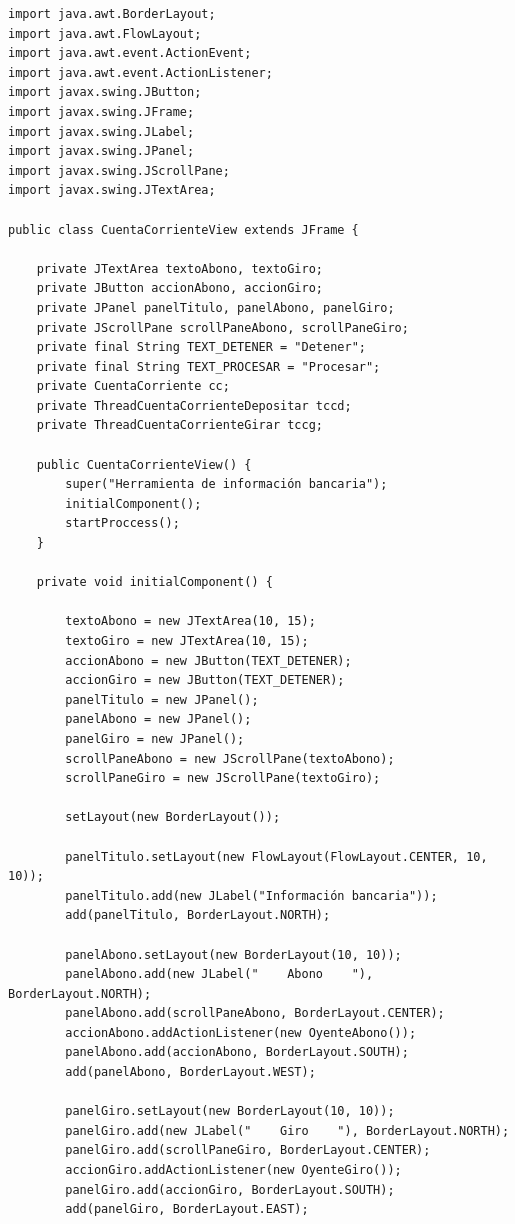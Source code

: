 \documentclass[10pt]{article}
\begin{document}
	\begin{verbatim}
import java.awt.BorderLayout;
import java.awt.FlowLayout;
import java.awt.event.ActionEvent;
import java.awt.event.ActionListener;
import javax.swing.JButton;
import javax.swing.JFrame;
import javax.swing.JLabel;
import javax.swing.JPanel;
import javax.swing.JScrollPane;
import javax.swing.JTextArea;

public class CuentaCorrienteView extends JFrame {

    private JTextArea textoAbono, textoGiro;
    private JButton accionAbono, accionGiro;
    private JPanel panelTitulo, panelAbono, panelGiro;
    private JScrollPane scrollPaneAbono, scrollPaneGiro;
    private final String TEXT_DETENER = "Detener";
    private final String TEXT_PROCESAR = "Procesar";
    private CuentaCorriente cc;
    private ThreadCuentaCorrienteDepositar tccd;
    private ThreadCuentaCorrienteGirar tccg;

    public CuentaCorrienteView() {
        super("Herramienta de información bancaria");
        initialComponent();
        startProccess();
    }

    private void initialComponent() {

        textoAbono = new JTextArea(10, 15);
        textoGiro = new JTextArea(10, 15);
        accionAbono = new JButton(TEXT_DETENER);
        accionGiro = new JButton(TEXT_DETENER);
        panelTitulo = new JPanel();
        panelAbono = new JPanel();
        panelGiro = new JPanel();
        scrollPaneAbono = new JScrollPane(textoAbono);
        scrollPaneGiro = new JScrollPane(textoGiro);

        setLayout(new BorderLayout());

        panelTitulo.setLayout(new FlowLayout(FlowLayout.CENTER, 10, 10));
        panelTitulo.add(new JLabel("Información bancaria"));
        add(panelTitulo, BorderLayout.NORTH);

        panelAbono.setLayout(new BorderLayout(10, 10));
        panelAbono.add(new JLabel("    Abono    "), BorderLayout.NORTH);
        panelAbono.add(scrollPaneAbono, BorderLayout.CENTER);
        accionAbono.addActionListener(new OyenteAbono());
        panelAbono.add(accionAbono, BorderLayout.SOUTH);
        add(panelAbono, BorderLayout.WEST);

        panelGiro.setLayout(new BorderLayout(10, 10));
        panelGiro.add(new JLabel("    Giro    "), BorderLayout.NORTH);
        panelGiro.add(scrollPaneGiro, BorderLayout.CENTER);
        accionGiro.addActionListener(new OyenteGiro());
        panelGiro.add(accionGiro, BorderLayout.SOUTH);
        add(panelGiro, BorderLayout.EAST);


\end{verbatim}
\end{document}
